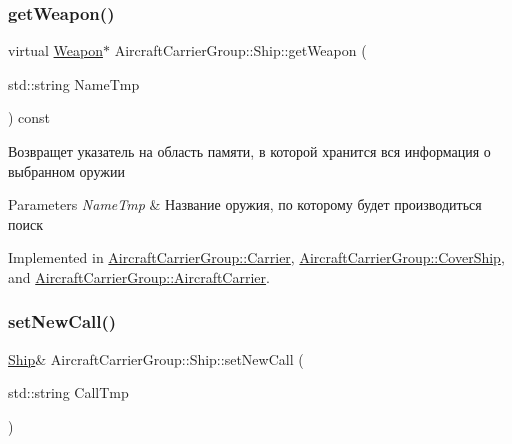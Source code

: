 \subsubsection{\texorpdfstring{get\+Weapon()}{getWeapon()}}
{\footnotesize\ttfamily virtual \mbox{\hyperlink{class_aircraft_carrier_group_1_1_weapon}{Weapon}}$\ast$ Aircraft\+Carrier\+Group\+::\+Ship\+::get\+Weapon (\begin{DoxyParamCaption}\item[{std\+::string}]{Name\+Tmp }\end{DoxyParamCaption}) const\hspace{0.3cm}{\ttfamily [pure virtual]}}



Возвращет указатель на область памяти, в которой хранится вся информация о выбранном оружии 


\begin{DoxyParams}{Parameters}
{\em Name\+Tmp} & Название оружия, по которому будет производиться поиск \\
\hline
\end{DoxyParams}


Implemented in \mbox{\hyperlink{class_aircraft_carrier_group_1_1_carrier_a69e4672d2e5b0e7ff0d27e9ec762b828}{Aircraft\+Carrier\+Group\+::\+Carrier}}, \mbox{\hyperlink{class_aircraft_carrier_group_1_1_cover_ship_ab587c598ab12561d4ecad32c5f55a04e}{Aircraft\+Carrier\+Group\+::\+Cover\+Ship}}, and \mbox{\hyperlink{class_aircraft_carrier_group_1_1_aircraft_carrier_aa7839178084e4f749592e02d2d8e93a4}{Aircraft\+Carrier\+Group\+::\+Aircraft\+Carrier}}.

\mbox{\label{class_aircraft_carrier_group_1_1_ship_a67d7642e2a6cf16ce87299f701bf98f7}} 
\subsubsection{\texorpdfstring{set\+New\+Call()}{setNewCall()}}
{\footnotesize\ttfamily \mbox{\hyperlink{class_aircraft_carrier_group_1_1_ship}{Ship}}\& Aircraft\+Carrier\+Group\+::\+Ship\+::set\+New\+Call (\begin{DoxyParamCaption}\item[{std\+::string}]{Call\+Tmp }\end{DoxyParamCaption})\hspace{0.3cm}{\ttfamily [inline]}}



